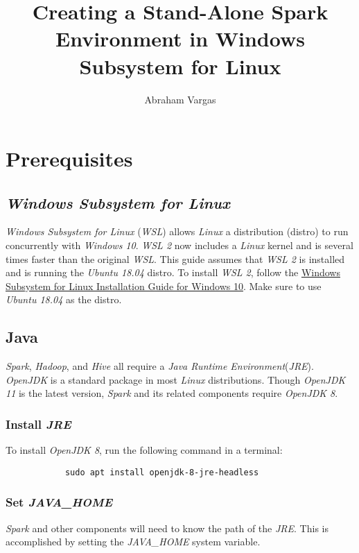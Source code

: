 \documentclass{article}
\begin{document}
\title{Creating a Stand-Alone Spark Environment in Windows Subsystem for Linux}
\author{Abraham Vargas}
\maketitle

\newpage
\tableofcontents
\newpage

\section{Prerequisites}

    \subsection{\emph{Windows Subsystem for Linux}}
    \emph{Windows Subsystem for Linux} (\emph{WSL}) allows \emph{Linux} a distribution (distro) to
    run concurrently with \emph{Windows 10}. \emph{WSL 2} now includes a \emph{Linux}
    kernel and is several times faster than the original \emph{WSL}. This guide assumes that \emph{WSL 2}
    is installed and is running the \emph{Ubuntu 18.04} distro. To install \emph{WSL 2}, follow the
    \href{https://docs.microsoft.com/en-us/windows/wsl/install-win10}{Windows Subsystem for Linux Installation Guide for Windows 10}.
    Make sure to use \emph{Ubuntu 18.04} as the distro.

    \subsection{Java}
    \emph{Spark}, \emph{Hadoop}, and \emph{Hive} all require a \emph{Java Runtime Environment}(\emph{JRE}).
    \emph{OpenJDK} is a standard package in most \emph{Linux} distributions. Though \emph{OpenJDK 11}
    is the latest version, \emph{Spark} and its related components require \emph{OpenJDK 8}.
    
        \subsubsection{Install \emph{JRE}}
        To install \emph{OpenJDK 8}, run the following command in a terminal:
        \begin{verbatim}
            sudo apt install openjdk-8-jre-headless            
        \end{verbatim}

        \subsubsection{Set \emph{JAVA\_HOME}}
        \emph{Spark} and other components will need to know the path of the
        \emph{JRE}. This is accomplished by setting the \emph{JAVA\_HOME}
        system variable.
\end{document}
